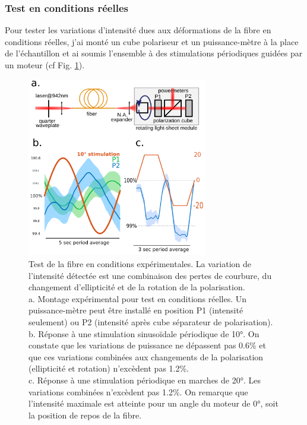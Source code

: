 \subsubsection{Test en conditions réelles}


Pour tester les variations d'intensité dues aux déformations de la fibre en conditions réelles, j'ai monté un cube polariseur et un puissance-mètre à la place de l'échantillon et ai soumis l'ensemble à des stimulations périodiques guidées par un moteur (cf Fig. \ref{FIGrealconditionsfiber}).

\begin{figure}
\centering
\includegraphics[width=0.7\textwidth]{./files/real-condition_intensity-variation.png}
\caption{Test de la fibre en conditions expérimentales. La variation de l'intensité détectée est une combinaison des pertes de courbure, du changement d'ellipticité et de la rotation de la polarisation. 
\\ a. Montage expérimental pour test en conditions réelles. Un puissance-mètre peut être installé en position P1 (intensité seulement) ou P2 (intensité après cube séparateur de polarisation).
\\ b. Réponse à une stimulation sinusoïdale périodique de 10°. On constate que les variations de puissance ne dépassent pas 0.6\% et que ces variations combinées aux changements de la polarisation (ellipticité et rotation) n'excèdent pas 1.2\%.
\\ c. Réponse à une stimulation périodique en marches de 20°. Les variations combinées n'excèdent pas 1.2\%. On remarque que l'intensité maximale est atteinte pour un angle du moteur de 0°, soit la position de repos de la fibre.
\label{FIGrealconditionsfiber}}
\end{figure}

